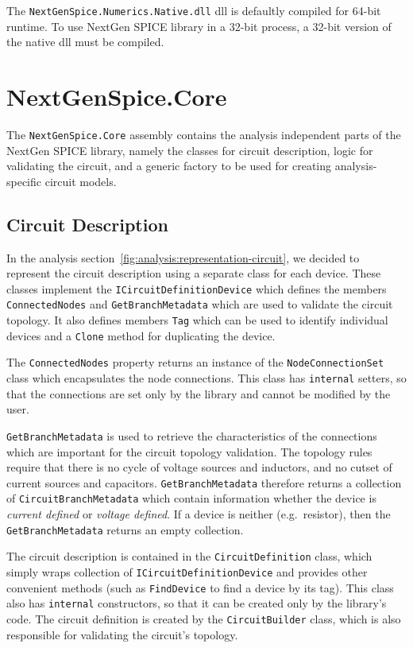 The \texttt{NextGenSpice\+.Numerics\+.Native.dll} dll is defaultly compiled for 64-bit runtime. To use NextGen SPICE library in a 32-bit process, a 32-bit version of the  native dll must be compiled.

\section{NextGenSpice.Core}

The \texttt{NextGenSpice.Core} assembly contains the analysis independent parts of the NextGen SPICE library, namely the classes for circuit description, logic for validating the circuit, and a generic factory to be used for creating analysis-specific circuit models.

\subsection{Circuit Description}

In the analysis section~\ref{fig:analysis:representation-circuit}, we decided to represent the circuit description using a separate class for each device. These classes implement the \texttt{ICircuitDefinition\+Device} which defines the members \texttt{ConnectedNodes} and \texttt{GetBranchMetadata} which are used to validate the circuit topology. It also defines members \texttt{Tag} which can be used to identify individual devices and a \texttt{Clone} method for duplicating the device.

The \texttt{ConnectedNodes} property returns an instance of the \texttt{NodeConnectionSet} class which encapsulates the node connections. This class has \texttt{internal} setters, so that the connections are set only by the library and cannot be modified by the user.

\texttt{GetBranchMetadata} is used to retrieve the characteristics of the connections which are important for the circuit topology validation. The topology rules require that there is no cycle of voltage sources and inductors, and no cutset of current sources and capacitors. \texttt{GetBranchMetadata} therefore returns a collection of \texttt{CircuitBranchMetadata}  which contain information whether the device is \textit{current defined} or \textit{voltage defined}. If a device is neither (e.g.\ resistor), then the \texttt{GetBranchMetadata} returns an empty collection.

The circuit description is contained in the \texttt{CircuitDefinition} class, which simply wraps collection of \texttt{ICircuitDefinitionDevice} and provides other convenient methods (such as \texttt{FindDevice} to find a device by its tag). This class also has \texttt{internal} constructors, so that it can be created only by the library's code. The circuit definition is created by the \texttt{CircuitBuilder} class, which is also responsible for validating the circuit's topology.

